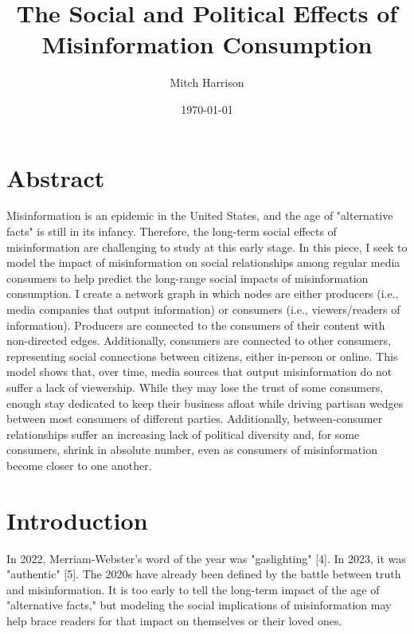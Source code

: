 \documentclass[titlepage, 12pt, leqno]{article}
\title{\Huge{The Social and Political Effects of Misinformation Consumption}}
\author{\large{Mitch Harrison}}
\date{\today}
\begin{document}
\setlength{\parskip}{1\baselineskip}
\setlength{\parindent}{15pt}
\maketitle
\tableofcontents
\newpage


\section{Abstract}
Misinformation is an epidemic in the United States, and the age of "alternative facts" is still in its infancy. Therefore, the long-term social effects of misinformation are challenging to study at this early stage. In this piece, I seek to model the impact of misinformation on social relationships among regular media consumers to help predict the long-range social impacts of misinformation consumption. I create a network graph in which nodes are either producers (i.e., media companies that output information) or consumers (i.e., viewers/readers of information). Producers are connected to the consumers of their content with non-directed edges. Additionally, consumers are connected to other consumers, representing social connections between citizens, either in-person or online. This model shows that, over time, media sources that output misinformation do not suffer a lack of viewership. While they may lose the trust of some consumers, enough stay dedicated to keep their business afloat while driving partisan wedges between most consumers of different parties. Additionally, between-consumer relationships suffer an increasing lack of political diversity and, for some consumers, shrink in absolute number, even as consumers of misinformation become closer to one another.

\pagebreak
\section{Introduction}
In 2022, Merriam-Webster's word of the year was "gaslighting" [4]. In 2023, it was "authentic" [5]. The 2020s have already been defined by the battle between truth and misinformation. It is too early to tell the long-term impact of the age of "alternative facts," but modeling the social implications of misinformation may help brace readers for that impact on themselves or their loved ones. 
\end{document}

